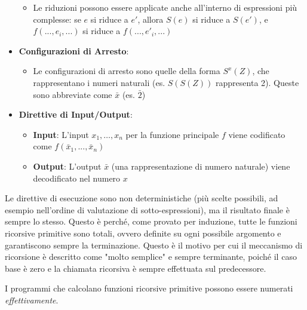 \documentclass[12pt, a4paper]{report}
\begin{document}
\begin{itemize}
\begin{itemize}
\begin{itemize}
\begin{itemize}
                            \end{itemize}
                        \end{itemize}
                        \item Le riduzioni possono essere applicate anche all'interno di espressioni più complesse: se $e$ si riduce a $e'$, allora $S(e)$ si riduce a $S(e')$, e $f(... , e_i, ...)$ si riduce a $f(... , e'_i, ...)$
                    \end{itemize}
                    \item \textbf{Configurazioni di Arresto}: \begin{itemize}
                        \item Le configurazioni di arresto sono quelle della forma $S^x(Z)$, che rappresentano i numeri naturali (es. $S(S(Z))$ rappresenta 2). Queste sono abbreviate come $\bar{x}$ (es. $\bar{2}$)
                    \end{itemize}
                    \item \textbf{Direttive di Input/Output}: \begin{itemize}
                        \item \textbf{Input}: L'input $x_1, \ldots, x_n$ per la funzione principale $f$ viene codificato come $f(\bar{x}_1, ..., \bar{x}_n)$
                        \item \textbf{Output}: L'output $\bar{x}$ (una rappresentazione di numero naturale) viene decodificato nel numero $x$
                    \end{itemize}
                \end{itemize}
                \begin{example}
                    
                \end{example}
                Le direttive di esecuzione sono non deterministiche (più scelte possibili, ad esempio nell'ordine di valutazione di sotto-espressioni), ma il risultato finale è sempre lo stesso. Questo è perché, come provato per induzione, tutte le funzioni ricorsive primitive sono totali, ovvero definite su ogni possibile argomento e garantiscono sempre la terminazione. Questo è il motivo per cui il meccanismo di ricorsione è descritto come "molto semplice" e sempre terminante, poiché il caso base è zero e la chiamata ricorsiva è sempre effettuata sul predecessore.
                \begin{definitionbox}{}{}
                    I programmi che calcolano funzioni ricorsive primitive possono essere numerati \textit{effettivamente}.
                \end{definitionbox}
\end{document}
